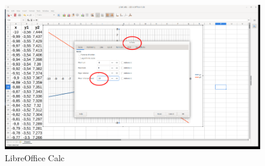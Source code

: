 \begin{figure}[h!]		
	\centering
   	\includegraphics[width=8.0in]{pictures/picture_029.png}
  	\caption{LibreOffice Calc}
   	\label{fig:LibreOfficeCalc029}
\end{figure}